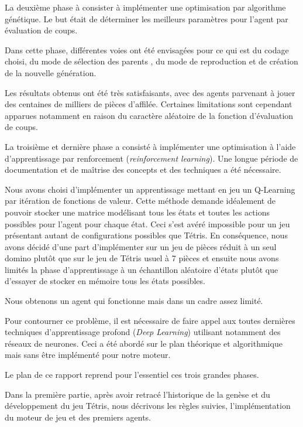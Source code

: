 \bigskip

La deuxième phase à consister à implémenter une optimisation par algorithme génétique. Le but était de déterminer les \og meilleurs \fg{} paramètres pour l'agent par évaluation de coups.

Dans cette phase, différentes voies ont été envisagées pour ce qui est du codage choisi, du mode de sélection des \og parents \fg{}, du mode de reproduction et de création de la nouvelle génération.

Les résultats obtenus ont été très satisfaisants, avec des agents parvenant à jouer des centaines de milliers de pièces d'affilée. Certaines limitations sont cependant apparues notamment en raison du caractère aléatoire de la fonction d'évaluation de coups.

\bigskip

La troisième et dernière phase a consisté à implémenter une optimisation à l'aide d'apprentissage par renforcement (\textit{reinforcement learning}). Une longue période  de documentation et de maîtrise des concepts et des techniques a été nécessaire. 

Nous avons choisi d'implémenter un apprentissage mettant en jeu un Q-Learning par itération de fonctions de valeur. Cette méthode demande idéalement de pouvoir stocker une matrice modélisant tous les états et toutes les actions possibles pour l'agent pour chaque état. Ceci s'est avéré impossible pour un jeu présentant autant de configurations possibles que Tétris. En conséquence, nous avons décidé d'une part d'implémenter sur un jeu de pièces réduit à un seul domino plutôt que sur le jeu de Tétris usuel à 7 pièces et ensuite nous avons limités la phase d'apprentissage à un échantillon aléatoire d'états plutôt que d'essayer de stocker en mémoire tous les états possibles.

Nous obtenons un agent qui fonctionne mais dans un cadre assez limité.

Pour contourner ce problème, il est nécessaire de faire appel aux toutes dernières techniques d'apprentissage profond (\textit{Deep Learning}) utilisant notamment des réseaux de neurones. Ceci a été abordé sur le plan théorique et algorithmique mais sans être implémenté pour notre moteur.

\bigskip

Le plan de ce rapport reprend pour l'essentiel ces trois grandes phases. 

Dans la première partie, après avoir retracé l'historique de la genèse et du développement du jeu Tétris, nous décrivons les règles suivies, l'implémentation du moteur de jeu et des premiers agents. 

